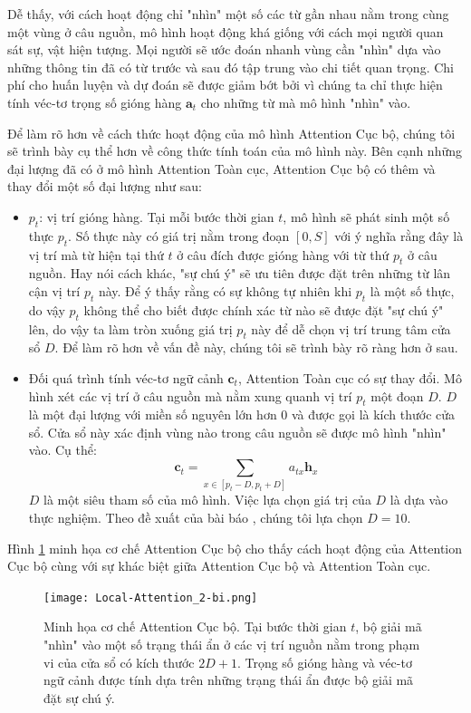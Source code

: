 Dễ thấy, với cách hoạt động chỉ "nhìn" một số các từ gần nhau nằm trong cùng một vùng ở câu nguồn, mô hình hoạt động khá giống với cách mọi người quan sát sự, vật hiện tượng. Mọi người sẽ ước đoán nhanh vùng cần "nhìn" dựa vào những thông tin đã có từ trước và sau đó tập trung vào chi tiết quan trọng. Chi phí cho huấn luyện và dự đoán sẽ được giảm bớt bởi vì chúng ta chỉ thực hiện tính véc-tơ trọng số gióng hàng $\bm{a}_t$ cho những từ mà mô hình "nhìn" vào.

Để làm rõ hơn về cách thức hoạt động của mô hình Attention Cục bộ, chúng tôi sẽ trình bày cụ thể hơn về công thức tính toán của mô hình này. Bên cạnh những đại lượng đã có ở mô hình Attention Toàn cục, Attention Cục bộ có thêm và thay đổi một số đại lượng như sau:
\begin{itemize}
	\item $p_t$: vị trí gióng hàng. Tại mỗi bước thời gian $t$, mô hình sẽ phát sinh một số thực $p_t$. Số thực này có giá trị nằm trong đoạn $[0, S]$ với ý nghĩa rằng đây là vị trí mà từ hiện tại thứ $t$ ở câu đích được gióng hàng với từ thứ $p_t$ ở câu nguồn. Hay nói cách khác, "sự chú ý" sẽ ưu tiên được đặt trên những từ lân cận vị trí $p_t$ này. Để ý thấy rằng có sự không tự nhiên khi $p_t$ là một số thực, do vậy $p_t$ không thể cho biết được chính xác từ nào sẽ được đặt "sự chú ý" lên, do vậy ta làm tròn xuống giá trị $p_t$ này để dễ chọn vị trí trung tâm cửa sổ $D$. Để làm rõ hơn về vấn đề này, chúng tôi sẽ trình bày rõ ràng hơn ở sau.
	\item Đối quá trình tính véc-tơ ngữ cảnh $\bm{c}_t$, Attention Toàn cục có sự thay đổi. Mô hình xét các vị trí ở câu nguồn mà nằm xung quanh vị trí $p_t$ một đoạn $D$. $D$ là một đại lượng với miền số nguyên lớn hơn 0 và được gọi là kích thước cửa sổ. Cửa sổ này xác định vùng nào trong câu nguồn sẽ được mô hình "nhìn" vào. Cụ thể:
	\begin{equation}
	\bm{c}_t = \sum_{x \in [p_t - D, p_t + D]} a_{tx} \bm{h}_x
	\end{equation}
	$D$ là một siêu tham số của mô hình. Việc lựa chọn giá trị của $D$ là dựa vào thực nghiệm. Theo đề xuất của bài báo \cite{attentionThangLuong2015}, chúng tôi lựa chọn $D = 10$.
\end{itemize}

Hình \ref{fig_Local_Attention} minh họa cơ chế Attention Cục bộ cho thấy cách hoạt động của Attention Cục bộ cùng với sự khác biệt giữa Attention Cục bộ và Attention Toàn cục.

\begin{figure}
	\centering
	\texttt{[image: Local-Attention\_2-bi.png]}
	\caption[Minh họa cơ chế Attention Cục bộ.]{Minh họa cơ chế Attention Cục bộ. Tại bước thời gian $t$, bộ giải mã "nhìn" vào một số trạng thái ẩn ở các vị trí nguồn nằm trong phạm vi của cửa sổ có kích thước $2D + 1$. Trọng số gióng hàng và véc-tơ ngữ cảnh được tính dựa trên những trạng thái ẩn được bộ giải mã đặt sự chú ý.}
	\label{fig_Local_Attention}
\end{figure}

